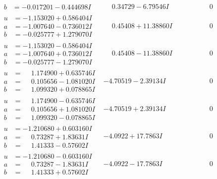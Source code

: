 \documentclass[1p]{elsarticle_modified}
\theoremstyle{definition}
\begin{document}
$$\begin{array}{c|c|c}
\begin{aligned}
b &= -0.017201 - 0.444698 I\end{aligned}
 & \phantom{-}0.34729 - 6.79546 I & \phantom{-0.000000 } 0 \\ \hline\begin{aligned}
u &= -1.153020 + 0.586404 I \\
a &= -1.007640 - 0.736012 I \\
b &= -0.025777 + 1.279070 I\end{aligned}
 & \phantom{-}0.45408 + 11.38860 I & \phantom{-0.000000 } 0 \\ \hline\begin{aligned}
u &= -1.153020 - 0.586404 I \\
a &= -1.007640 + 0.736012 I \\
b &= -0.025777 - 1.279070 I\end{aligned}
 & \phantom{-}0.45408 - 11.38860 I & \phantom{-0.000000 } 0 \\ \hline\begin{aligned}
u &= \phantom{-}1.174900 + 0.635746 I \\
a &= \phantom{-}0.105656 - 1.081020 I \\
b &= \phantom{-}1.099320 + 0.078865 I\end{aligned}
 & -4.70519 - 2.39134 I & \phantom{-0.000000 } 0 \\ \hline\begin{aligned}
u &= \phantom{-}1.174900 - 0.635746 I \\
a &= \phantom{-}0.105656 + 1.081020 I \\
b &= \phantom{-}1.099320 - 0.078865 I\end{aligned}
 & -4.70519 + 2.39134 I & \phantom{-0.000000 } 0 \\ \hline\begin{aligned}
u &= -1.210680 + 0.603160 I \\
a &= \phantom{-}0.73287 + 1.83631 I \\
b &= \phantom{-}1.41333 - 0.57602 I\end{aligned}
 & -4.0922 + 17.7863 I & \phantom{-0.000000 } 0 \\ \hline\begin{aligned}
u &= -1.210680 - 0.603160 I \\
a &= \phantom{-}0.73287 - 1.83631 I \\
b &= \phantom{-}1.41333 + 0.57602 I\end{aligned}
 & -4.0922 - 17.7863 I & \phantom{-0.000000 } 0 \\ \hline\begin{aligned}

\end{aligned}
\end{array}$$
\end{document}
